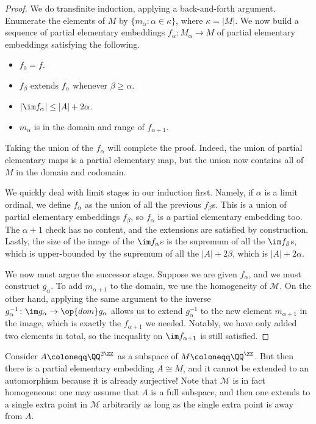 \documentclass[../notes.tex]{subfiles}
\begin{document}
\begin{proof}
	We do transfinite induction, applying a back-and-forth argument. Enumerate the elements of $M$ by $\{m_\alpha:\alpha\in\kappa\}$, where $\kappa=\left|M\right|$. We now build a sequence of partial elementary embeddings $f_\alpha:M_\alpha\to M$ of partial elementary embeddings satisfying the following.
	\begin{itemize}
		\item $f_0=f$.
		\item $f_\beta$ extends $f_\alpha$ whenever $\beta\ge\alpha$.
		\item $\left|\im f_\alpha\right|\le\left|A\right|+2\alpha$.
		\item $m_\alpha$ is in the domain and range of $f_{\alpha+1}$.
	\end{itemize}
	Taking the union of the $f_\alpha$ will complete the proof. Indeed, the union of partial elementary maps is a partial elementary map, but the union now contains all of $M$ in the domain and codomain.

	We quickly deal with limit stages in our induction first. Namely, if $\alpha$ is a limit ordinal, we define $f_\alpha$ as the union of all the previous $f_\beta$s. This is a union of partial elementary embeddings $f_\beta$, so $f_\alpha$ is a partial elementary embedding too. The $\alpha+1$ check has no content, and the extensions are satisfied by construction. Lastly, the size of the image of the $\im f_\alpha$s is the supremum of all the $\im f_\beta$s, which is upper-bounded by the supremum of all the $\left|A\right|+2\beta$, which is $\left|A\right|+2\alpha$.

	We now must argue the successor stage. Suppose we are given $f_\alpha$, and we must construct $g_{\alpha}$. To add $m_{\alpha+1}$ to the domain, we use the homogeneity of $\mathcal M$. On the other hand, applying the same argument to the inverse $g_\alpha^{-1}\colon\im g_\alpha\to\op{dom}g_\alpha$ allows us to extend $g_\alpha^{-1}$ to the new element $m_{\alpha+1}$ in the image, which is exactly the $f_{\alpha+1}$ we needed. Notably, we have only added two elements in total, so the inequality on $\im f_{\alpha+1}$ is still satisfied.
\end{proof}
\begin{nex}
	Consider $A\coloneqq\QQ^{2\ZZ}$ as a subspace of $M\coloneqq\QQ^\ZZ$. But then there is a partial elementary embedding $A\cong M$, and it cannot be extended to an automorphism because it is already surjective! Note that $\mathcal M$ is in fact homogeneous: one may assume that $A$ is a full subspace, and then one extends to a single extra point in $\mathcal M$ arbitrarily as long as the single extra point is away from $A$.
\end{nex}
\end{document}

